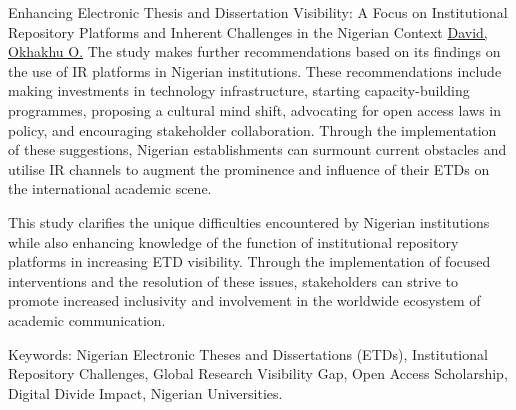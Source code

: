 \begin{abstract_online}{Enhancing Electronic Thesis and Dissertation Visibility: A Focus on Institutional Repository Platforms and Inherent Challenges in the Nigerian Context}{%
        \underline{David, Okhakhu O.}}
    The study makes further recommendations based on its findings on the use of IR platforms in Nigerian institutions. These recommendations include making investments in technology infrastructure, starting capacity-building programmes, proposing a cultural mind shift, advocating for open access laws in policy, and encouraging stakeholder collaboration. Through the implementation of these suggestions, Nigerian establishments can surmount current obstacles and utilise IR channels to augment the prominence and influence of their ETDs on the international academic scene. 

    This study clarifies the unique difficulties encountered by Nigerian institutions while also enhancing knowledge of the function of institutional repository platforms in increasing ETD visibility. Through the implementation of focused interventions and the resolution of these issues, stakeholders can strive to promote increased inclusivity and involvement in the worldwide ecosystem of academic communication. 

    Keywords: Nigerian Electronic Theses and Dissertations (ETDs), Institutional Repository Challenges, Global Research Visibility Gap, Open Access Scholarship, Digital Divide Impact, Nigerian Universities.
\end{abstract_online}

